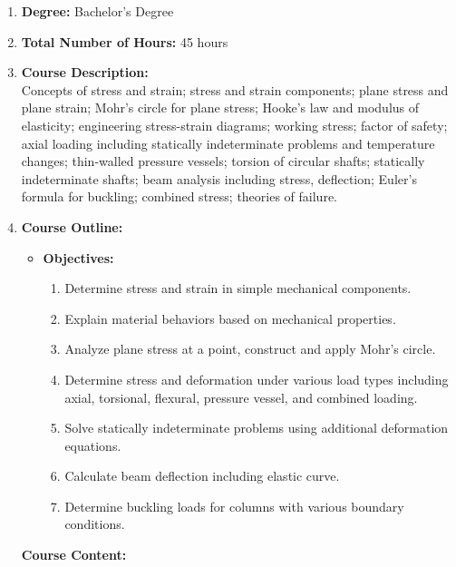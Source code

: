 \documentclass[12pt]{article}
\begin{document}
\begin{enumerate}
\begin{itemize}
        \end{itemize}
    \item \textbf{Degree:} Bachelor's Degree
    \item \textbf{Total Number of Hours:} 45 hours
    \item \textbf{Course Description:} \\
    Concepts of stress and strain; stress and strain components; plane stress and plane strain; Mohr's circle for plane stress; Hooke's law and modulus of elasticity; engineering stress-strain diagrams; working stress; factor of safety; axial loading including statically indeterminate problems and temperature changes; thin-walled pressure vessels; torsion of circular shafts; statically indeterminate shafts; beam analysis including stress, deflection; Euler's formula for buckling; combined stress; theories of failure.

    \item \textbf{Course Outline:}
        \begin{itemize}
            \item \textbf{Objectives:}
                \begin{enumerate}
                    \item Determine stress and strain in simple mechanical components.
                    \item Explain material behaviors based on mechanical properties.
                    \item Analyze plane stress at a point, construct and apply Mohr's circle.
                    \item Determine stress and deformation under various load types including axial, torsional, flexural, pressure vessel, and combined loading.
                    \item Solve statically indeterminate problems using additional deformation equations.
                    \item Calculate beam deflection including elastic curve.
                    \item Determine buckling loads for columns with various boundary conditions.
                \end{enumerate}
        \end{itemize}

        \textbf{Course Content:}


\end{enumerate}
\end{document}
